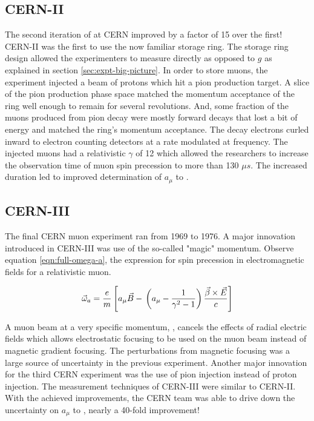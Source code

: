 \subsection{CERN-II}
The second iteration of \mugmtwo at CERN improved by a factor of 15 over the first!  CERN-II was the first \mugmtwo to use the now familiar storage ring.  The storage ring design allowed the experimenters to measure \gmtwo directly as opposed to $g$ as explained in section \ref{sec:expt-big-picture}. In order to store muons, the experiment injected a beam of protons which hit a pion production target.  A slice of the pion production phase space matched the momentum acceptance of the ring well enough to remain for several revolutions. And, some fraction of the muons produced from pion decay were mostly forward decays that lost a bit of energy and matched the ring's momentum acceptance.  The decay electrons curled inward to electron counting detectors at a rate modulated at \gmtwo frequency.  The injected muons had a relativistic $\gamma$ of 12 which allowed the researchers to increase the observation time of muon spin precession to more than 130 $\mu s$.  The increased duration led to improved determination of $a_\mu$ to \cite{47y-muon-g-2}.

\subsection{CERN-III}
The final CERN muon \gmtwo experiment ran from 1969 to 1976.  A major innovation introduced in CERN-III was use of the so-called "magic" momentum. Observe equation \ref{eqn:full-omega-a}, the expression for spin precession in electromagnetic fields for a relativistic muon.

\begin{equation}
\label{eqn:full-omega-a}
\vec{\omega}_a = \frac{e}{m} \left[ a_\mu \vec{B} - \\
\left(a_\mu - \frac{1}{\gamma^2 - 1} \right) \\
\frac{\vec{\beta} \times \vec{E}}{c} \right]
\end{equation}

\noindent A muon beam at a very specific momentum, \pmagic, cancels the effects of radial electric fields which allows electrostatic focusing to be used on the muon beam instead of magnetic gradient focusing.  The perturbations from magnetic focusing was a large source of uncertainty in the previous experiment.  Another major innovation for the third CERN experiment was the use of pion injection instead of proton injection.  The measurement techniques of CERN-III were similar to CERN-II.  With the achieved improvements, the CERN team was able to drive down the uncertainty on $a_\mu$ to \cite{47y-muon-g-2}, nearly a 40-fold improvement!

